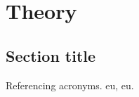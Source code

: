 \setcounter{chapter}{1} 

\chapter{Theory}
\section{Section title}
Referencing acronyms. \acrlong{eu}, \acrshort{eu}.